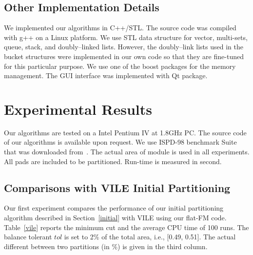 \documentclass[journal]{IEEEtran}
\begin{document}
\subsection{Other Implementation Details}
We implemented our algorithms in C++/STL. The source code was compiled
with g++ on a Linux platform.
We use STL data structure for vector, multi-sets, queue, stack, and 
doubly--linked lists. However, the doubly--link lists used in the
bucket structures were implemented in our own code so that they are
fine-tuned for this particular purpose. We use one of the boost
packages for the memory management. The GUI interface was implemented
with Qt package. 


\section{Experimental Results}
\label{experiment}
Our algorithms are tested on a Intel Pentium IV at 1.8GHz PC.
The source code of our algorithms is available upon request.
We use ISPD-98 benchmark Suite
that was downloaded from~\cite{ispd98_benchmark}. The actual area of
module is used in all experiments. All pads are included to be
partitioned. Run-time is measured in second.

\subsection{Comparisons with VILE Initial Partitioning}
Our first experiment compares the performance of our initial partitioning
algorithm described in Section~\ref{initial} with VILE using
our flat-FM code. Table~\ref{vile} reports the minimum cut and the
average CPU time of 100 runs. The balance tolerant $tol$
is set to 2\% of the total area, i.e., [0.49, 0.51]. The actual
different between two partitions (in \%) is given in the third column.
\end{document}
